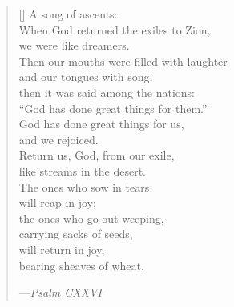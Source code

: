 \documentclass[a4paper,12pt,openany]{memoir}
\newcommand{\HgSource}[1]{\hfill{\small---\itshape{#1}}}
\begin{document}
\noindent
\begin{minipage}{.47\textwidth}
  \settowidth{\versewidth}{When God returned the exiles to Zion}
  \begin{verse}[\versewidth]
    A song of ascents: \\
    When God returned the exiles to Zion, \\
    \vin we were like dreamers. \\
    Then our mouths were filled with laughter \\
    \vin and our tongues with song; \\
    then it was said among the nations: \\
    \vin ``God has done great things for them.'' \\
    God has done great things for us, \\
    \vin and we rejoiced. \\
    Return us, God, from our exile, \\
    \vin like streams in the desert. \\
    The ones who sow in tears \\
    \vin will reap in joy; \\
    the ones who go out weeping, \\
    \vin carrying sacks of seeds, \\
    will return in joy, \\
    \vin bearing sheaves of wheat.

    \HgSource{Psalm CXXVI}
  \end{verse}
\end{minipage}
\hfill
\end{document}
